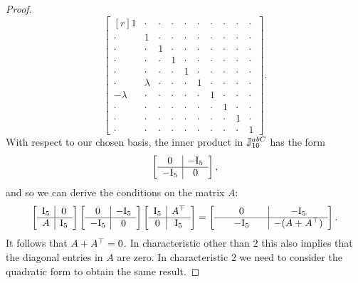 \begin{proof}
\begin{equation*}
\begin{bmatrix}[r]
		1 & \cdot & \cdot & \cdot & \cdot & \cdot & \cdot & \cdot & \cdot & \cdot  \\
		 \cdot & 1 & \cdot & \cdot & \cdot & \cdot & \cdot & \cdot & \cdot & \cdot  \\
		 \cdot & \cdot &1 &  \cdot & \cdot & \cdot & \cdot & \cdot & \cdot & \cdot \\
		  \cdot & \cdot & \cdot & 1 & \cdot & \cdot & \cdot & \cdot & \cdot & \cdot \\
		  \cdot & \cdot & \cdot & \cdot & 1 & \cdot & \cdot & \cdot & \cdot & \cdot \\
		  \cdot & \lambda  & \cdot & \cdot & \cdot & 1 &  \cdot & \cdot & \cdot & \cdot \\
		  -\lambda & \cdot & \cdot & \cdot & \cdot & \cdot & 1 &  \cdot & \cdot & \cdot  \\
		  \cdot & \cdot & \cdot & \cdot & \cdot & \cdot & \cdot & 1 &  \cdot & \cdot \\
		  \cdot & \cdot & \cdot & \cdot & \cdot & \cdot & \cdot & \cdot & 1 & \cdot \\
		  \cdot & \cdot & \cdot & \cdot & \cdot & \cdot & \cdot & \cdot & \cdot & 1  
	
	\end{bmatrix}.
	\end{equation*}
With respect to our chosen basis, the inner product in 
	$\mathbb{J}_{10}^{abC}$ has the form
	\begin{equation*}
		\left[
			\begin{array}{c|c}
				0 & -\mathord{\mathrm{I}}_5 \\ \hline
				-\mathord{\mathrm{I}}_5 & 0
			\end{array}
		\right],
	\end{equation*}
	and so we can derive the conditions on the matrix $A$:
	\begin{equation*}
		\left[
			\begin{array}{c|c}
				\II_5 & 0 \\ \hline
				A & \II_5
			\end{array}
		\right]
		\left[
			\begin{array}{c|c}
				0 & -\II_5 \\ \hline
				-\II_5 & 0
			\end{array}
		\right]
		\left[
			\begin{array}{c|c}
				\II_5 & A^{\T} \\ \hline
				0 & \II_5
			\end{array}
		\right] = 
		\left[
			\begin{array}{@{\;\;\;\;\;\;\;}c@{\;\;\;\;\;\;\;}|c}
				 0 & -\II_5 \\ \hline
				-\II_5 & -(A+A^{\T})
			\end{array}
		\right].
	\end{equation*}
	It follows that $A + A^{\top} = 0$. In characteristic other than $2$ this also implies that the diagonal entries in $A$ are zero. 
	In characteristic $2$ we need to consider the quadratic form to obtain the same result.


\end{proof}
